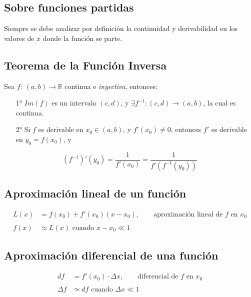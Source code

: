 \documentclass[11pt,titlepage]{article}
\begin{document}
\subsection{Sobre funciones partidas}
Siempre se debe analizar por definición la continuidad y derivabilidad en los valores de $x$ donde la función se parte.

\subsection{Teorema de la Función Inversa}
Sea $f: \ (a,b) \to \mathbb{R}$ continua e \emph{inyectiva}, entonces:
\begin{itemize}
	\item[1°] $Im(f)$ es un intervalo $(c,d)$, y $\exists f^{-1}: (c,d) \to (a,b)$, la cual es continua.
	\item[2°] Si $f$ es derivable en $x_0 \in (a,b)$, y $f'(x_0) \neq 0$, entonces $f'$ es derivable en $y_0 = f(x_0)$, y  
\end{itemize}
\begin{equation}
	\left(f^{-1}\right)'(y_0) = \frac{1}{f'(x_0)} = \frac{1}{f'\left(f^{-1}(y_0)\right)}
\end{equation}

\subsection{Aproximación lineal de un función}
\begin{equation}
	\begin{aligned}
		L(x) &= f(x_0) + f'(x_0)(x - x_0), \qquad \text{aproximación lineal de $f$ en $x_0$} \\ \\
		f(x) &\simeq L(x) \text{ cuando } x - x_0 \ll 1
	\end{aligned}
\end{equation}

\subsection{Aproximación diferencial de una función}
\begin{equation}
	\begin{aligned}
		df &= f'(x_0) \cdot \Delta x, \qquad \text{diferencial de $f$ en $x_0$} \\ \\
		\Delta f &\simeq df \text{ cuando } \Delta x \ll 1
	\end{aligned}
\end{equation}
\end{document}
